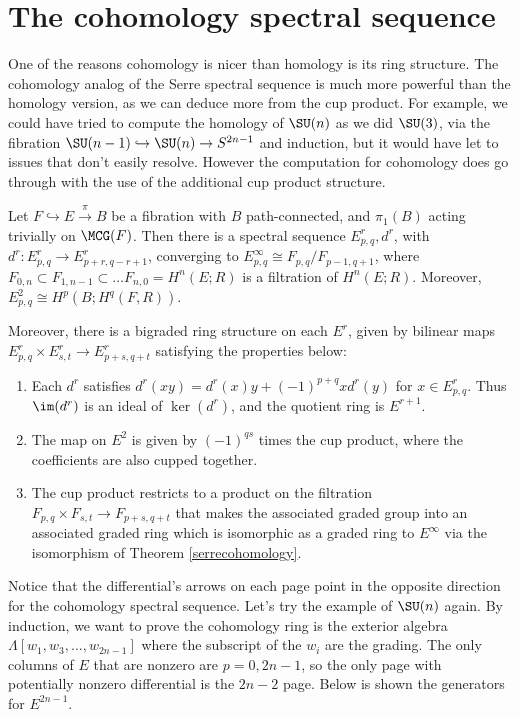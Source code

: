 \documentclass[12pt,oneside]{amsart}
\begin{document}
\section{The cohomology spectral sequence}

One of the reasons cohomology is nicer than homology is its ring structure. The cohomology analog of the Serre spectral sequence is much more powerful than the homology version, as we can deduce more from the cup product. For example, we could have tried to compute the homology of $\SU(n)$ as we did $\SU(3)$, via the fibration $\SU(n-1) \hookrightarrow \SU(n) \to S^{2n-1}$ and induction, but it would have let to issues that don't easily resolve. However the computation for cohomology does go through with the use of the additional cup product structure.

\begin{theorem}\label{serrecohomology}
Let $F \hookrightarrow E \xrightarrow{\pi} B$ be a fibration with $B$ path-connected, and $\pi_1(B)$ acting trivially on $\MCG(F)$. Then there is a spectral sequence $E^r_{p,q},d^r$, with $d^r:E^r_{p,q} \to E^r_{p+r,q-r+1}$, converging to $E^\infty_{p,q} \cong F_{p,q}/F_{p-1,q+1}$, where $F_{0,n} \subset F_{1,n-1} \subset \dots F_{n,0} = H^n(E;R)$ is a filtration of $H^n(E;R)$. Moreover, $E^2_{p,q} \cong H^p(B;H^q(F,R))$.
\end{theorem}

Moreover, there is a bigraded ring structure on each $E^r$, given by bilinear maps $E^r_{p,q}\times E^r_{s,t} \to E^r_{p+s,q+t}$ satisfying the properties below:

\begin{enumerate}
    \item Each $d^r$ satisfies $d^r(xy) = d^r(x)y + (-1)^{p+q}xd^r(y)$ for $x \in E^r_{p,q}$. Thus $\im(d^r)$ is an ideal of $\ker(d^r)$, and the quotient ring is $E^{r+1}$.
    \item The map on $E^2$ is given by $(-1)^{qs}$ times the cup product, where the coefficients are also cupped together.
    \item The cup product restricts to a product on the filtration $F_{p,q}\times F_{s,t} \to F_{p+s,q+t}$ that makes the associated graded group into an associated graded ring which is isomorphic as a graded ring to $E^\infty$ via the isomorphism of Theorem \ref{serrecohomology}.
\end{enumerate}

Notice that the differential's arrows on each page point in the opposite direction for the cohomology spectral sequence. Let's try the example of $\SU(n)$ again. By induction, we want to prove the cohomology ring is the exterior algebra $\Lambda[w_1,w_3,\dots,w_{2n-1}]$ where the subscript of the $w_i$ are the grading. The only columns of $E$ that are nonzero are $p = 0, 2n-1$, so the only page with potentially nonzero differential is the $2n-2$ page. Below is shown the generators for $E^{2n-1}$.
\end{document}
